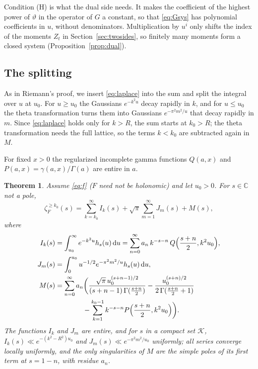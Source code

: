 \documentclass[11pt,reqno]{amsart}
\newtheorem{theorem}{Theorem}[section]
\theoremstyle{definition}
\theoremstyle{remark}
\newcommand{\dd}{\,\mathrm{d}}
\newcommand{\CC}{\mathbb{C}}
\begin{document}
Condition (H) is what the dual side needs. It makes the coefficient of the highest power of $\vartheta$ in the
operator of $G$ a constant, so that \eqref{eq:Gsys} has polynomial coefficients in $u$, without denominators.
Multiplication by $u^i$ only shifts the index of the moments $Z_t$ in Section~\ref{sec:twosides}, so finitely many
moments form a closed system (Proposition~\ref{prop:dual}).

\subsection{The splitting}
As in Riemann's proof, we insert \eqref{eq:laplace} into the sum and split the integral over $u$ at $u_0$. For
$u \ge u_0$ the Gaussians $e^{-k^2u}$ decay rapidly in $k$, and for $u \le u_0$ the theta transformation turns them into
Gaussians $e^{-\pi^2m^2/u}$ that decay rapidly in $m$. Since \eqref{eq:laplace} holds only for $k > R$, the sum starts
at $k_0 > R$; the theta transformation needs the full lattice, so the terms $k < k_0$ are subtracted again in $M$.

For fixed $x > 0$ the regularized incomplete gamma functions $Q(a,x)$ and $P(a,x) = \gamma(a,x)/\Gamma(a)$ are
entire in $a$.

\begin{theorem}\label{thm:split}
Assume \eqref{eq:f} ($F$ need not be holonomic) and let $u_0 > 0$. For $s \in \CC$ not a pole,
\[
  \zeta_F^{\ge k_0}(s) = \sum_{k=k_0}^{\infty}I_k(s) + \sqrt\pi\sum_{m=1}^{\infty}J_m(s) + M(s),
\]
where
\begin{align*}
  I_k(s) &= \int_{u_0}^\infty e^{-k^2u}h_s(u)\dd u = \sum_{n=0}^{\infty}a_n\,k^{-s-n}\,Q\Bigl(\frac{s+n}2, k^2u_0\Bigr), \\
  J_m(s) &= \int_0^{u_0}u^{-1/2}e^{-\pi^2m^2/u}h_s(u)\dd u, \\
  M(s) &= \sum_{n=0}^{\infty}a_n\biggl(\frac{\sqrt\pi\,u_0^{(s+n-1)/2}}{(s+n-1)\,\Gamma(\frac{s+n}{2})}
     - \frac{u_0^{(s+n)/2}}{2\,\Gamma(\frac{s+n}2+1)} \\
     &\qquad\qquad - \sum_{k=1}^{k_0-1}k^{-s-n}P\Bigl(\frac{s+n}2, k^2u_0\Bigr)\biggr).
\end{align*}
The functions $I_k$ and $J_m$ are entire, and for $s$ in a compact set $\mathcal K$,
$I_k(s) \ll e^{-(k^2-R^2)u_0}$ and $J_m(s) \ll e^{-\pi^2m^2/u_0}$ uniformly; all series converge locally uniformly,
and the only singularities of $M$ are the simple poles of its first term at $s = 1-n$, with residue $a_n$.
\end{theorem}
\end{document}
